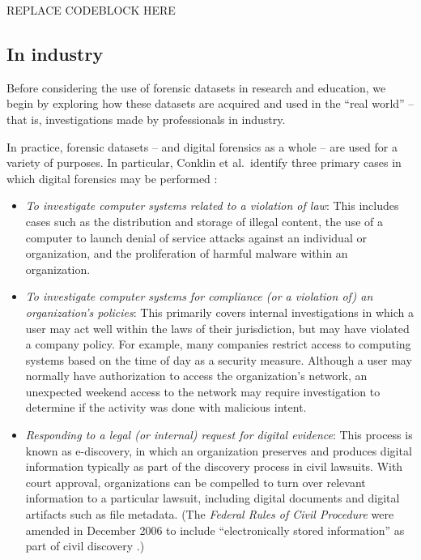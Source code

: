 \documentclass[letterpaper,12pt]{report}
\def\tightlist{}
\begin{document}
REPLACE CODEBLOCK HERE

\subsection{In industry}\label{in-industry}

Before considering the use of forensic datasets in research and
education, we begin by exploring how these datasets are acquired and
used in the ``real world'' -- that is, investigations made by
professionals in industry.

In practice, forensic datasets -- and digital forensics as a whole --
are used for a variety of purposes. In particular, Conklin et
al.~identify three primary cases in which digital forensics may be
performed \cite{conklinComputerForensics2022}:

\begin{itemize}
\tightlist
\item
  \emph{To investigate computer systems related to a violation of law}:
  This includes cases such as the distribution and storage of illegal
  content, the use of a computer to launch denial of service attacks
  against an individual or organization, and the proliferation of
  harmful malware within an organization.
\item
  \emph{To investigate computer systems for compliance (or a violation
  of) an organization's policies}: This primarily covers internal
  investigations in which a user may act well within the laws of their
  jurisdiction, but may have violated a company policy. For example,
  many companies restrict access to computing systems based on the time
  of day as a security measure. Although a user may normally have
  authorization to access the organization's network, an unexpected
  weekend access to the network may require investigation to determine
  if the activity was done with malicious intent.
\item
  \emph{Responding to a legal (or internal) request for digital
  evidence}: This process is known as e-discovery, in which an
  organization preserves and produces digital information typically as
  part of the discovery process in civil lawsuits. With court approval,
  organizations can be compelled to turn over relevant information to a
  particular lawsuit, including digital documents and digital artifacts
  such as file metadata. (The \emph{Federal Rules of Civil Procedure}
  were amended in December 2006 to include ``electronically stored
  information'' as part of civil discovery
  \cite{withersj.ElectronicallyStoredInformation2006}.)
\end{itemize}
\end{document}

